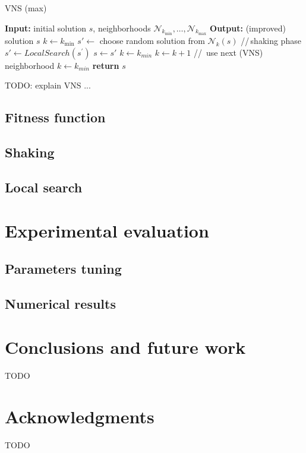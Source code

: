 \documentclass[sigconf]{acmart}
\begin{document}
     \begin{algorithm}[!t] 
  	\caption{VNS  (max)}\label{alg:vns}
  	\begin{algorithmic}[1]
  		\STATE \textbf{Input:} initial solution $s$, neighborhoods  $\mathcal{N}_{k_{\min}},\ldots, \mathcal{N}_{k_{\max}}$ 
  		\STATE \textbf{Output:} (improved) solution $s$
  		\STATE $k \gets  k_{\min}$
  		\STATE  $s' \gets$ choose random solution from $\mathcal{N}_k(s)$ \hspace{0.3cm}//\,shaking phase
  		\STATE $s' \gets  LocalSearch(s^{'})$
  		\STATE $s \gets s'$
  		\STATE $k \gets k_{min}$
  		\ELSE 
  		\STATE $k \gets k+1$ \hspace{0.3cm}//\, use next (VNS) neighborhood
  		\STATE $k\gets k_{min}$
  		\ENDIF
  		\ENDIF
  		\ENDWHILE
  		\STATE \textbf{return} $s$
  	\end{algorithmic}
  \end{algorithm}

TODO: explain VNS ... 

   \subsection{Fitness function}
  
   \subsection{Shaking}
   
   \subsection{Local search}
 

\section{Experimental evaluation}


\subsection{Parameters tuning}

\subsection{Numerical results }
 
\section{Conclusions and future work}
 TODO
 
\section*{Acknowledgments} 
TODO



 
\end{document}
